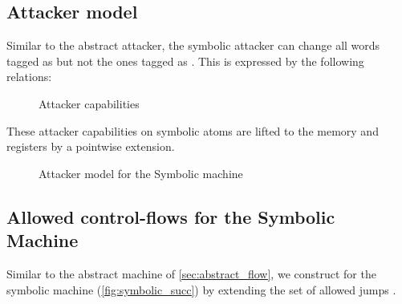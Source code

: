 \subsection{Attacker model}\label{sec:symbolic_attacker}

Similar to the abstract attacker, the symbolic attacker can change all words
tagged as \DATAname but not the ones tagged as \INSTRname. This is expressed by
the following relations:

\begin{figure}[htbp]
\bigskip
{}
\caption{Attacker capabilities}
\label{fig:symbolic_attacker_atom}
\end{figure}

These attacker capabilities on symbolic atoms are lifted to
the memory and registers by a pointwise extension.

\begin{figure}[htbp]
\caption{Attacker model for the Symbolic machine}
\label{fig:symbolic_attacker}
\end{figure}

\subsection{Allowed control-flows for the Symbolic Machine}
\label{sec:symbolic_flow}

Similar to the abstract machine of \cref{sec:abstract_flow}, we construct
 for the symbolic machine (\cref{fig:symbolic_succ}) by
extending the set of allowed jumps \CFG.


